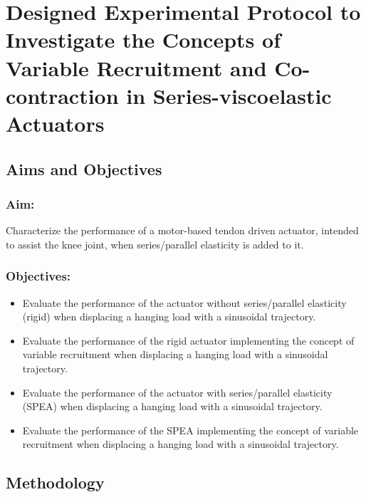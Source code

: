 \chapter{Designed Experimental Protocol to Investigate the Concepts of Variable Recruitment and Co-contraction in Series-viscoelastic Actuators} \label{appendixB}

\section{Aims and Objectives}

\subsection{Aim:}

Characterize the performance of a motor-based tendon driven actuator, intended to assist the knee joint, when series/parallel elasticity is added to it.

\subsection{Objectives:}
\begin{itemize}
    \item Evaluate the performance of the actuator without series/parallel elasticity (rigid) when displacing a hanging load with a sinusoidal trajectory.
    \item Evaluate the performance of the rigid actuator implementing the concept of variable recruitment when displacing a hanging load with a sinusoidal trajectory.
    \item Evaluate the performance of the actuator with series/parallel elasticity (SPEA) when displacing a hanging load with a sinusoidal trajectory.
    \item Evaluate the performance of the SPEA implementing the concept of variable recruitment when displacing a hanging load with a sinusoidal trajectory.
\end{itemize}

\section{Methodology}


